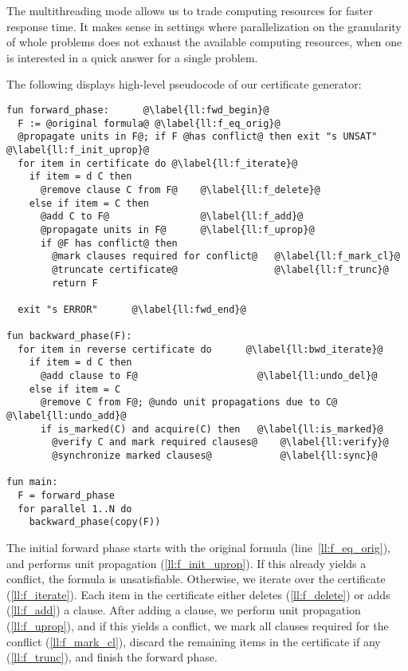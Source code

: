 \documentclass[smallcondensed]{svjour3}     %
\makeatletter
\newcommand{\withlinenumbers}{%
  \lstset{numbers=left,numberstyle=\scriptsize,xleftmargin=2em,numberblanklines=false,countblanklines=false,escapechar=@}%
}
\makeatother
\begin{document}
The multithreading mode allows us to trade computing resources for faster response time. It makes sense in settings where parallelization 
on the granularity of whole problems does not exhaust the available computing resources, \eg when one is interested in a quick answer for a single problem.

The following displays high-level pseudocode of our certificate generator:
{\withlinenumbers
\begin{lstlisting}[language=pseudo]
fun forward_phase:      @\label{ll:fwd_begin}@
  F := @original formula@ @\label{ll:f_eq_orig}@
  @propagate units in F@; if F @has conflict@ then exit "s UNSAT"  @\label{ll:f_init_uprop}@
  for item in certificate do @\label{ll:f_iterate}@
    if item = d C then 
      @remove clause C from F@    @\label{ll:f_delete}@
    else if item = C then
      @add C to F@                @\label{ll:f_add}@
      @propagate units in F@      @\label{ll:f_uprop}@
      if @F has conflict@ then
        @mark clauses required for conflict@   @\label{ll:f_mark_cl}@
        @truncate certificate@                 @\label{ll:f_trunc}@   
        return F

  exit "s ERROR"      @\label{ll:fwd_end}@

fun backward_phase(F):
  for item in reverse certificate do      @\label{ll:bwd_iterate}@
    if item = d C then
      @add clause to F@                     @\label{ll:undo_del}@
    else if item = C
      @remove C from F@; @undo unit propagations due to C@  @\label{ll:undo_add}@
      if is_marked(C) and acquire(C) then   @\label{ll:is_marked}@  
        @verify C and mark required clauses@    @\label{ll:verify}@
        @synchronize marked clauses@            @\label{ll:sync}@
        
fun main:
  F = forward_phase
  for parallel 1..N do
    backward_phase(copy(F))
\end{lstlisting}
}

The initial forward phase starts with the original formula (line~\ref{ll:f_eq_orig}), and performs unit propagation (\ref{ll:f_init_uprop}). 
If this already yields a conflict, the formula is unsatisfiable. Otherwise, we iterate over the certificate (\ref{ll:f_iterate}). Each item in the certificate either
deletes (\ref{ll:f_delete}) or adds (\ref{ll:f_add}) a clause. After adding a clause, we perform unit propagation (\ref{ll:f_uprop}), and if this yields a conflict,
we mark all clauses required for the conflict (\ref{ll:f_mark_cl}), discard the remaining items in the certificate if any (\ref{ll:f_trunc}), and finish the forward phase.
\end{document}
